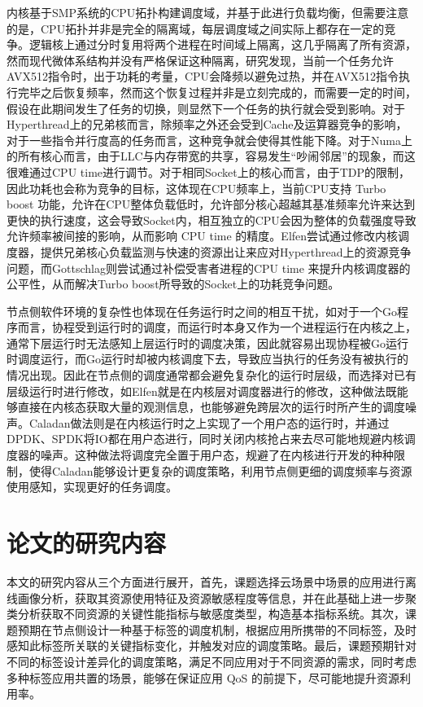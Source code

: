 内核基于SMP系统的CPU拓扑构建调度域，并基于此进行负载均衡，但需要注意的是，CPU拓扑并非是完全的隔离域，每层调度域之间实际上都存在一定的竞争。逻辑核上通过分时复用将两个进程在时间域上隔离，这几乎隔离了所有资源，然而现代微体系结构并没有严格保证这种隔离，研究发现，当前一个任务允许AVX512指令时，出于功耗的考量，CPU会降频以避免过热，并在AVX512指令执行完毕之后恢复频率，然而这个恢复过程并非是立刻完成的，而需要一定的时间\citep{gottschlag2020avx}，假设在此期间发生了任务的切换，则显然下一个任务的执行就会受到影响。对于Hyperthread上的兄弟核而言，除频率之外还会受到Cache及运算器竞争的影响，对于一些指令并行度高的任务而言，这种竞争就会使得其性能下降。对于Numa上的所有核心而言，由于LLC与内存带宽的共享，容易发生“吵闹邻居”的现象，而这很难通过CPU time进行调节。对于相同Socket上的核心而言，由于TDP的限制，因此功耗也会称为竞争的目标，这体现在CPU频率上，当前CPU支持 Turbo boost 功能，允许在CPU整体负载低时，允许部分核心超越其基准频率允许来达到更快的执行速度，这会导致Socket内，相互独立的CPU会因为整体的负载强度导致允许频率被间接的影响，从而影响 CPU time 的精度。Elfen\citep{yang2016elfen}尝试通过修改内核调度器，提供兄弟核心负载监测与快速的资源出让来应对Hyperthread上的资源竞争问题，而Gottschlag\citep{gottschlag2020avx}则尝试通过补偿受害者进程的CPU time 来提升内核调度器的公平性，从而解决Turbo boost所导致的Socket上的功耗竞争问题。

节点侧软件环境的复杂性也体现在任务运行时之间的相互干扰，如对于一个Go程序而言，协程受到运行时的调度，而运行时本身又作为一个进程运行在内核之上，通常下层运行时无法感知上层运行时的调度决策，因此就容易出现协程被Go运行时调度运行，而Go运行时却被内核调度下去，导致应当执行的任务没有被执行的情况出现。因此在节点侧的调度通常都会避免复杂化的运行时层级，而选择对已有层级运行时进行修改，如Elfen就是在内核层对调度器进行的修改，这种做法既能够直接在内核态获取大量的观测信息，也能够避免跨层次的运行时所产生的调度噪声。Caladan\citep{fried2020caladan}做法则是在内核运行时之上实现了一个用户态的运行时，并通过DPDK、SPDK将IO都在用户态进行，同时关闭内核抢占来去尽可能地规避内核调度器的噪声。这种做法将调度完全置于用户态，规避了在内核进行开发的种种限制，使得Caladan能够设计更复杂的调度策略，利用节点侧更细的调度频率与资源使用感知，实现更好的任务调度。

\section{论文的研究内容}

本文的研究内容从三个方面进行展开，首先，课题选择云场景中场景的应用进行离线画像分析，获取其资源使用特征及资源敏感程度等信息，并在此基础上进一步聚类分析获取不同资源的关键性能指标与敏感度类型，构造基本指标系统。其次，课题预期在节点侧设计一种基于标签的调度机制，根据应用所携带的不同标签，及时感知此标签所关联的关键指标变化，并触发对应的调度策略。最后，课题预期针对不同的标签设计差异化的调度策略，满足不同应用对于不同资源的需求，同时考虑多种标签应用共置的场景，能够在保证应用 QoS 的前提下，尽可能地提升资源利用率。

